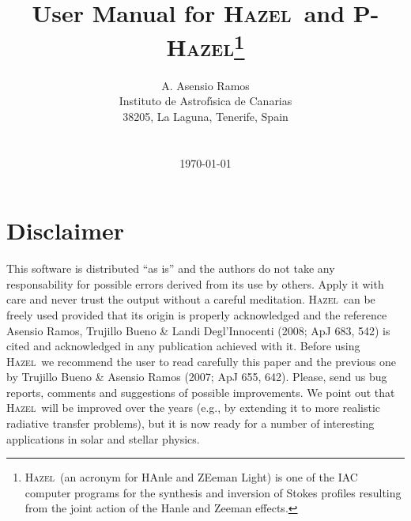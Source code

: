 \documentclass[12pt]{article}
\def\H{\textsc{Hazel}}
\def\HM{\textsc{P-Hazel}}
\begin{document}
\title                  {\sc User Manual for \H\ and \HM\footnote{\H\ (an acronym for HAnle and ZEeman Light) is one of the IAC computer
programs for the synthesis and inversion of Stokes profiles resulting from the joint action of the Hanle and Zeeman effects.}}

\author{ A. Asensio Ramos \\
         Instituto de Astrof\'{\i}sica de Canarias\\
         38205, La Laguna, Tenerife, Spain\\ \\
        \\[0.5in] \today}
\date{}
\maketitle

\newpage

\tableofcontents

\newpage

\section*{Disclaimer}

This software is distributed ``as is'' and the authors do not take any responsability for
possible errors derived from its use by others. Apply it with care and
never trust the output without a careful meditation. \H\ can be freely used
provided that its origin is properly acknowledged and the reference Asensio Ramos, 
Trujillo Bueno \& Landi Degl'Innocenti (2008; ApJ 683, 542) is cited and acknowledged in any
publication achieved with it. Before using \H\ we recommend the user to read carefully this
paper and the previous one by Trujillo Bueno \& Asensio Ramos (2007; ApJ 655, 642). Please, 
send us bug reports, comments and suggestions of possible improvements.
We point out that \H\ will be improved over the years (e.g., by extending it to more
realistic radiative transfer problems), but it is now ready for a number of
interesting applications in solar and stellar physics.
\end{document}
